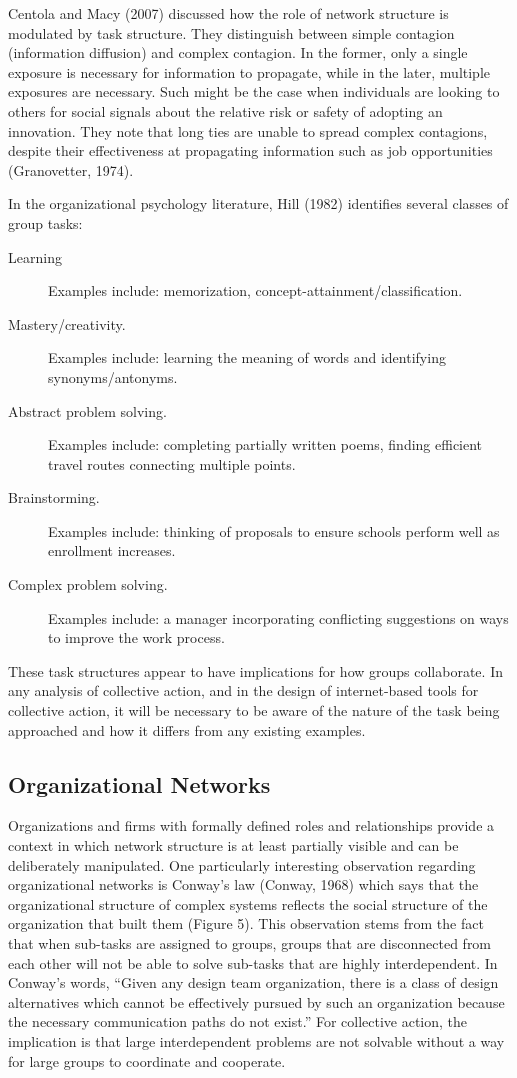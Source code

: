 Centola and Macy (2007) discussed how the role of network structure is modulated by task structure. They distinguish between simple contagion (information diffusion) and complex contagion. In the former, only a single exposure is necessary for information to propagate, while in the later, multiple exposures are necessary. Such might be the case when individuals are looking to others for social signals about the relative risk or safety of adopting an innovation. They note that long ties are unable to spread complex contagions, despite their effectiveness at propagating information such as job opportunities (Granovetter, 1974).

In the organizational psychology literature, Hill (1982) identifies several classes of group tasks:

\begin{description}
\item[Learning]{Examples include: memorization, concept-attainment/classification.}
\item[Mastery/creativity.]{Examples include: learning the meaning of words and identifying synonyms/antonyms.}
\item[Abstract problem solving.]{Examples include: completing partially written poems, finding efficient travel routes connecting multiple points.}
\item[Brainstorming.]{Examples include: thinking of proposals to ensure schools perform well as enrollment increases.}
\item[Complex problem solving.]{Examples include: a manager incorporating conflicting suggestions on ways to improve the work process.}
\end{description}

These task structures appear to have implications for how groups collaborate. In any analysis of collective action, and in the design of internet-based tools for collective action, it will be necessary to be aware of the nature of the task being approached and how it differs from any existing examples.

\subsection{Organizational Networks}
Organizations and firms with formally defined roles and relationships provide a context in which network structure is at least partially visible and can be deliberately manipulated. One particularly interesting observation regarding organizational networks is Conway's law (Conway, 1968) which says that the organizational structure of complex systems reflects the social structure of the organization that built them (Figure 5). This observation stems from the fact that when sub-tasks are assigned to groups, groups that are disconnected from each other will not be able to solve sub-tasks that are highly interdependent. In Conway's words, ``Given any design team organization, there is a class of design alternatives which cannot be effectively pursued by such an organization because the necessary communication paths do not exist.'' For collective action, the implication is that large interdependent problems are not solvable without a way for large groups to coordinate and cooperate.

